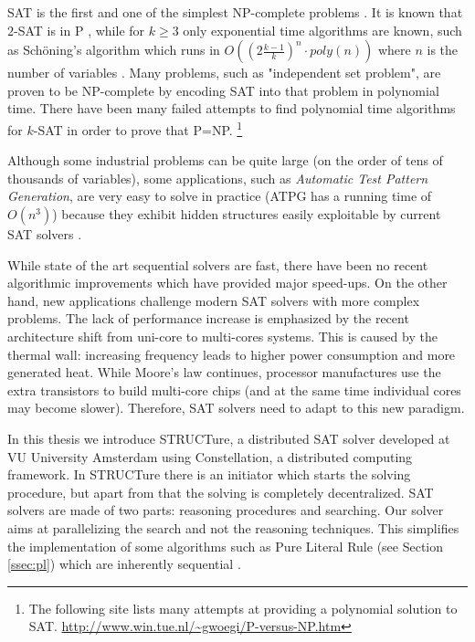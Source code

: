 SAT is the first and one of the simplest NP-complete problems
\cite{Cook:1971:CTP:800157.805047}. It is known that $2$-SAT
is in P \cite{karp}, while for $k \ge 3$ only exponential time
algorithms are known, such as Sch\"{o}ning's algorithm which runs in
$O((2\frac{k - 1}{k})^n \cdot poly(n))$ where $n$ is the number of
variables \cite{Schoning:1999:PAK:795665.796524}.  Many problems,
such as "independent set problem", are proven to be NP-complete
by encoding SAT into that problem in polynomial time.  There have
been many failed attempts to find polynomial time algorithms for
$k$-SAT in order to prove that P=NP.  \footnote{The following
site lists many attempts at providing a polynomial solution to
SAT. \url{http://www.win.tue.nl/~gwoegi/P-versus-NP.htm}}

Although some industrial problems can be quite large (on the order
of tens of thousands of variables), some applications, such
as \emph{Automatic Test Pattern Generation}, are very easy to
solve in practice (ATPG has a running time of $O(n^3)$) because they
exhibit hidden structures easily exploitable by current SAT solvers
\cite{Prasad:1999:WAE:309847.309857}.

While state of the art sequential solvers are fast, there have
been no recent algorithmic improvements which have provided major
speed-ups. On the other hand, new applications challenge modern SAT
solvers with more complex problems.  The lack of performance increase
is emphasized by the recent architecture shift from uni-core to
multi-cores systems. This is caused by the thermal wall: increasing
frequency leads to higher power consumption and more generated
heat. While Moore's law continues, processor manufactures use the
extra transistors to build multi-core chips (and at the same time
individual cores may become slower).  Therefore, SAT solvers need
to adapt to this new paradigm.

In this thesis we introduce STRUCTure, a distributed SAT solver
developed at VU University Amsterdam using Constellation,
a distributed computing framework. In STRUCTure there is an
initiator which starts the solving procedure, but apart from that
the solving is completely decentralized.  SAT solvers are made of
two parts: reasoning procedures and searching.  Our solver aims
at parallelizing the search and not the reasoning techniques.
This simplifies the implementation of some algorithms such as Pure
Literal Rule (see Section \ref{ssec:pl}) which are inherently sequential
\cite{Johannsen:2005:CPL:1166822.1166834}.

